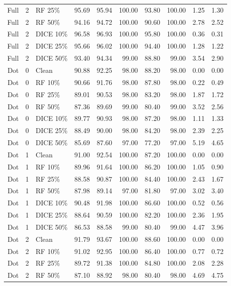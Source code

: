 {\begin{longtable}{rllrrrrrrr}
Full & 2 & RF 25\% & 95.69 & 95.94 & 100.00 & 93.80 & 100.00 & 1.25 & 1.30 \\
Full & 2 & RF 50\% & 94.16 & 94.72 & 100.00 & 90.60 & 100.00 & 2.78 & 2.52 \\
Full & 2 & DICE 10\% & 96.58 & 96.93 & 100.00 & 95.80 & 100.00 & 0.36 & 0.31 \\
Full & 2 & DICE 25\% & 95.66 & 96.02 & 100.00 & 94.40 & 100.00 & 1.28 & 1.22 \\
Full & 2 & DICE 50\% & 93.40 & 94.34 & 99.00 & 88.80 & 99.00 & 3.54 & 2.90 \\
Dot & 0 & Clean & 90.88 & 92.25 & 98.00 & 88.20 & 98.00 & 0.00 & 0.00 \\
Dot & 0 & RF 10\% & 90.66 & 91.76 & 98.00 & 87.80 & 98.00 & 0.22 & 0.49 \\
Dot & 0 & RF 25\% & 89.01 & 90.53 & 98.00 & 83.20 & 98.00 & 1.87 & 1.72 \\
Dot & 0 & RF 50\% & 87.36 & 89.69 & 99.00 & 80.40 & 99.00 & 3.52 & 2.56 \\
Dot & 0 & DICE 10\% & 89.77 & 90.93 & 98.00 & 87.20 & 98.00 & 1.11 & 1.33 \\
Dot & 0 & DICE 25\% & 88.49 & 90.00 & 98.00 & 84.20 & 98.00 & 2.39 & 2.25 \\
Dot & 0 & DICE 50\% & 85.69 & 87.60 & 97.00 & 77.20 & 97.00 & 5.19 & 4.65 \\
Dot & 1 & Clean & 91.00 & 92.54 & 100.00 & 87.20 & 100.00 & 0.00 & 0.00 \\
Dot & 1 & RF 10\% & 89.96 & 91.64 & 100.00 & 86.20 & 100.00 & 1.05 & 0.90 \\
Dot & 1 & RF 25\% & 88.58 & 90.87 & 100.00 & 84.40 & 100.00 & 2.43 & 1.67 \\
Dot & 1 & RF 50\% & 87.98 & 89.14 & 97.00 & 81.80 & 97.00 & 3.02 & 3.40 \\
Dot & 1 & DICE 10\% & 90.48 & 91.98 & 100.00 & 86.60 & 100.00 & 0.52 & 0.56 \\
Dot & 1 & DICE 25\% & 88.64 & 90.59 & 100.00 & 82.20 & 100.00 & 2.36 & 1.95 \\
Dot & 1 & DICE 50\% & 86.53 & 88.58 & 99.00 & 80.40 & 99.00 & 4.47 & 3.96 \\
Dot & 2 & Clean & 91.79 & 93.67 & 100.00 & 88.60 & 100.00 & 0.00 & 0.00 \\
Dot & 2 & RF 10\% & 91.02 & 92.95 & 100.00 & 86.40 & 100.00 & 0.77 & 0.72 \\
Dot & 2 & RF 25\% & 89.72 & 91.38 & 100.00 & 84.80 & 100.00 & 2.08 & 2.28 \\
Dot & 2 & RF 50\% & 87.10 & 88.92 & 98.00 & 80.40 & 98.00 & 4.69 & 4.75 \\

\end{longtable}}
